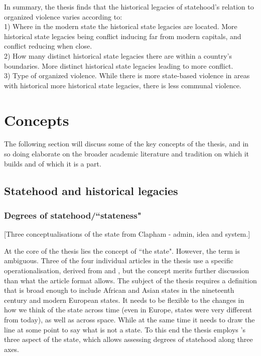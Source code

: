 \documentclass[12pt]{article}
\begin{document}
In summary, the thesis finds that the historical legacies of statehood's
relation to organized violence varies according to:\\

1) Where in the modern state the historical state legacies are located. More
historical state legacies being conflict inducing far from modern capitals, and
conflict reducing when close.\\

2) How many distinct historical state legacies there are within a country's 
boundaries. More distinct historical state legacies leading to more conflict.\\

3) Type of organized violence. While there is more state-based violence in areas
with historical more historical state legacies, there is less communal
violence.\\

\section{Concepts} \label{Concepts}

The following section will discuss some of the key concepts of the thesis, and in
so doing elaborate on the broader academic literature and tradition on which it
builds and of which it is a part.

\subsection{Statehood and historical legacies} \label{Statehood and historical legacies}

\subsubsection{Degrees of statehood/``stateness"} \label{Degrees of statehood} %


[Three conceptualisations of the state from Clapham - admin, idea and system.]

At the core of the thesis lies the concept of ``the state". However, the term is
ambiguous. Three of the four individual articles in the thesis use a specific
operationalisation, derived from \citet{Butcher2019} and \citet{Butcher2017},
but the concept merits further discussion than what the article format allows.
The subject of the thesis requires a definition that is broad enough to include
African and Asian states in the nineteenth century and modern European states.
It needs to be flexible to the changes in how we think of the state across time
(even in Europe, states were very different from today), as well as across
space. While at the same time it needs to draw the line at some point to say
what is not a state. To this end the thesis employs \citet{Clapham1996}'s three
aspect of the state, which allows assessing degrees of statehood along three
axes.
\end{document}
